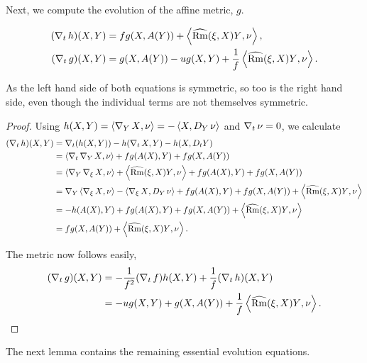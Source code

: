 \documentclass{amsart}
\begin{document}
Next, we compute the evolution of the affine metric, $g$.

\begin{lemma}
\label{lem:metric}
\begin{align*}
(\D_t h) (X, Y) &= f g(X, A(Y)) + \ip{\widehat{\Rm}(\vel, X) Y}{\nor}, \\
(\D_t g) (X, Y) &= g(X, A(Y)) - u g(X, Y) + \frac{1}{f} \ip{\widehat{\Rm}(\vel, X) Y}{\nor}.
\end{align*}
\end{lemma}

As the left hand side of both equations is symmetric, so too is the right hand side, even though the individual terms are not themselves symmetric.

\begin{proof}
Using $h(X,Y) = \ip{\D_Y X}{\nor} = -\ip{X}{D_Y \nor}$ and $\D_t\nor = 0$, we calculate
\[
\begin{split}
(\D_t h) (X, Y) &= \D_t (h(X, Y)) - h(\D_t X, Y) - h(X, D_t Y) \\
&= \ip{\D_t \D_Y X}{\nor} + f g(A(X), Y) + f g(X, A(Y)) \\
&= \ip{\D_Y \D_{\vel} X}{\nor} + \ip{\widehat{\Rm}(\vel, X) Y}{\nor} + f g(A(X), Y) + f g(X, A(Y))\\
&= \D_Y \ip{\D_{\vel} X}{\nor} - \ip{\D_{\vel} X}{D_Y \nor} + f g(A(X), Y) + f g(X, A(Y)) + \ip{\widehat{\Rm}(\vel, X) Y}{\nor} \\
&= - h(A(X), Y) + f g(A(X), Y) + f g(X, A(Y)) + \ip{\widehat{\Rm}(\vel, X) Y}{\nor} \\
&= fg(X, A(Y)) + \ip{\widehat{\Rm}(\vel, X) Y}{\nor}.
\end{split}
\]

The metric now follows easily,
\[
\begin{split}
(\D_t g) (X, Y) &= -\frac{1}{f^2} (\D_t f) h(X, Y) + \frac{1}{f} (\D_t h) (X, Y) \\
&= -u g(X, Y) + g(X, A(Y)) + \frac{1}{f} \ip{\widehat{\Rm}(\vel, X) Y}{\nor}.
\end{split}
\]
\end{proof}

The next lemma contains the remaining essential evolution equations.
\end{document}
